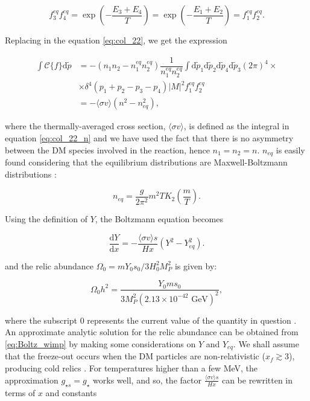 \documentclass[final,5p,times,twocolumn, nopreprintline]{elsarticle}
\numberwithin{equation}{section}
\begin{document}
\begin{equation}
f_3^{eq}f_4^{eq}=\exp\left(-\dfrac{E_3+E_4}{T}\right)=\exp\left(-\dfrac{E_1+E_2}{T}\right)=f_1^{eq}f_2^{eq}. \label{eq:eq_dist_wimp}
\end{equation}

Replacing in the equation \ref{eq:col_22}, we get the expression

\begin{align}
\int\mathcal{C}\{f\}\mathrm{d}\tilde{p}&=-(n_1n_2-n_1^{eq}n_2^{eq})\dfrac{1}{n_1^{eq}n_2^{eq}}\int\mathrm{d}\tilde{p}_1\mathrm{d}\tilde{p}_2\mathrm{d}\tilde{p}_4\mathrm{d}\tilde{p}_3(2\pi)^4\times\nonumber\\&\times\delta^4(p_1+p_2-p_3-p_4)|M|^2f_1^{eq}f_2^{eq}\nonumber\\&=-\langle\sigma v\rangle(n^2-n_{eq}^2), \label{eq:col_22_n}
\end{align}

where the thermally-averaged cross section, $\langle\sigma v\rangle$, is defined as the integral in equation \ref{eq:col_22_n} and we have used the fact that there is no asymmetry between the DM species involved in the reaction, hence $n_1=n_2=n$. $n_{eq}$ is easily found considering that the equilibrium distributions are Maxwell-Boltzmann distributions \cite{baumann2022cosmology}:

\begin{equation}
n_{eq} = \dfrac{g}{2\pi^2}m^2TK_2\left(\dfrac{m}{T}\right). \label{eq:neq}
\end{equation}

 Using the definition of $Y$, the Boltzmann equation becomes 

\begin{equation}
\dfrac{\mathrm{d}Y}{\mathrm{d}x}=-\dfrac{\langle\sigma v\rangle s}{Hx}(Y^2-Y_{eq}^2). \label{eq:Boltz_wimp}
\end{equation}

and the relic abundance $\Omega_0=mY_0s_0/3H_0^2M_P^2$ is given by:

\begin{equation}
\Omega_{0}h^2=\dfrac{Y_0ms_0}{3M_P^2(2.13\times 10^{-42}\text{ GeV})^2}, \label{eq:omegah2}
\end{equation}

where the subscript 0 represents the current value of the quantity in question \cite{mambrini2021particles}. An approximate analytic solution for the relic abundance can be obtained from \ref{eq:Boltz_wimp} by making some considerations on $Y$ and $Y_{eq}$. We shall assume that the freeze-out occurs when the DM particles are non-relativistic ($x_f\gtrsim3$), producing cold relics \cite{kolb1991early}. For temperatures higher than a few MeV, the approximation $g_{\star s}=g_\star$ works well, and so, the factor $\frac{\langle\sigma v\rangle s}{Hx}$ can be rewritten in terms of $x$ and constants
\end{document}
